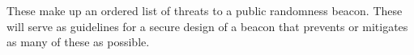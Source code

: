 These make up an ordered list of threats to a public randomness beacon. These will serve as guidelines for a secure design of a beacon that prevents or mitigates as many of these as possible.
